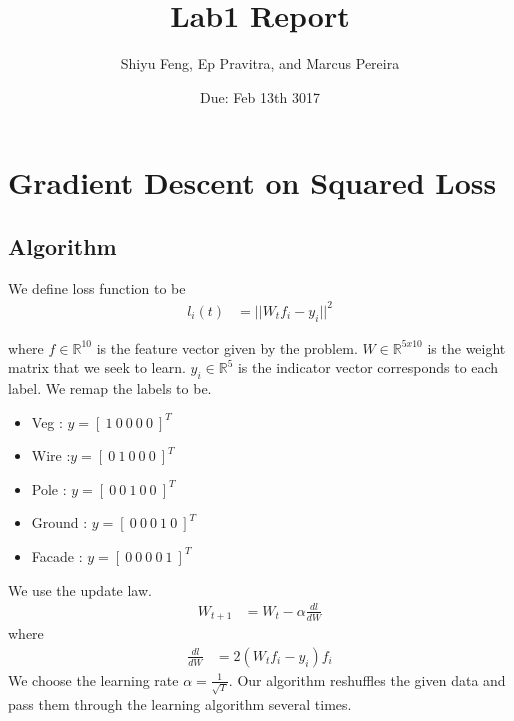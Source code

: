 \documentclass[letterpaper]{article}
\title{Lab1 Report }
\date{Due: Feb 13th 3017}
\author{Shiyu Feng, Ep Pravitra, and Marcus Pereira}
\begin{document}
\maketitle

\section{Gradient Descent on Squared Loss}

\subsection{Algorithm}
We define loss function to be
\begin{align}
l_i (t) &= ||W_t f_i - y_i||^2
\end{align}

 where $f \in  \mathbb{R}^{10}$ is the feature vector given by the problem.  $W \in  \mathbb{R}^{5x10}$ is the weight matrix that we seek to learn. $y_i \in  \mathbb{R}^5$ is the indicator vector corresponds to each label. We remap the labels to be.

\begin{itemize}
\item Veg : $y = [ \ 1 \ 0 \ 0 \ 0 \ 0 \ ]^T$
\item Wire :$y = [ \ 0 \ 1 \ 0 \ 0 \ 0 \ ]^T$
\item Pole : $y = [ \ 0 \ 0 \ 1 \ 0 \ 0 \ ]^T$
\item Ground : $y = [ \ 0 \ 0 \ 0 \ 1 \ 0 \ ]^T$
\item Facade : $y = [ \ 0 \ 0 \ 0 \ 0 \ 1 \ ]^T$
\end{itemize}
We use the update law.
\begin{align}
W_{t+1} &= W_t - \alpha  \frac{d l}{d W}
\end{align}
where 
\begin{align}
 \frac{d l}{d W} &= 2(W_t f_i - y_i) f_i
\end{align}
We choose the learning rate $\alpha = \frac{1}{\sqrt{T}}$. Our algorithm reshuffles the given data and pass them through the learning algorithm several times.  
\end{document}
